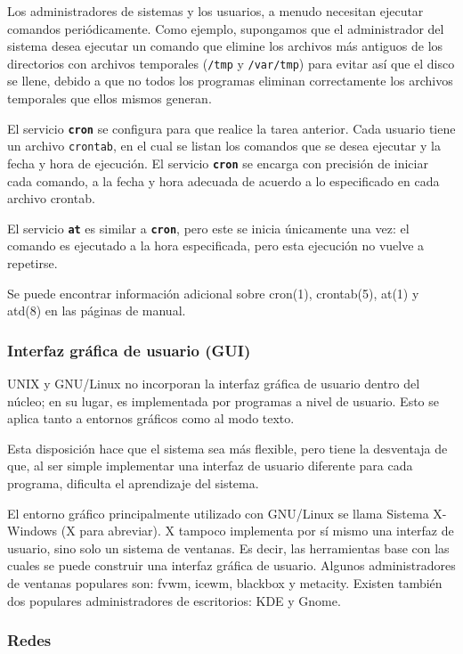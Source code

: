 \documentclass[12pt]{article}
\begin{document}
 Los administradores de sistemas y los usuarios, a menudo necesitan
ejecutar comandos periódicamente. Como ejemplo, supongamos que el administrador
del sistema desea ejecutar un comando que elimine los archivos más antiguos de
los directorios con archivos temporales (\texttt{/tmp} y
\texttt{/var/tmp}) para evitar así que el disco se llene, debido a
que no todos los programas eliminan correctamente los archivos temporales que
ellos mismos generan.  

 El servicio \texttt{\textbf{cron}} se configura para que realice la
tarea anterior. Cada usuario tiene un archivo \texttt{crontab}, en
el cual se listan los comandos que se desea ejecutar y la fecha y hora de
ejecución. El servicio \texttt{\textbf{cron}} se encarga con precisión de
iniciar cada comando, a la fecha y hora adecuada de acuerdo a lo especificado en
cada archivo crontab.  

 El servicio \texttt{\textbf{at}} es similar a \texttt{\textbf{cron}},
pero este se inicia únicamente una vez: el comando es ejecutado a la hora
especificada, pero esta ejecución no vuelve a repetirse.  

 Se puede encontrar información adicional sobre cron(1), crontab(5), at(1)
y atd(8) en las páginas de manual.  

\subsubsection{ Interfaz gráfica de usuario (GUI)}

 UNIX y GNU/Linux no incorporan la interfaz gráfica de usuario dentro del
núcleo; en su lugar, es implementada por programas a nivel de usuario. Esto se
aplica tanto a entornos gráficos como al modo texto.  

 Esta disposición hace que el sistema sea más flexible, pero tiene la
desventaja de que, al ser simple implementar una interfaz de usuario diferente
para cada programa, dificulta el aprendizaje del sistema.  

 El entorno gráfico principalmente utilizado con GNU/Linux se llama
Sistema X-Windows (X para abreviar). X tampoco implementa por sí mismo una
interfaz de usuario, sino solo un sistema de ventanas. Es decir, las
herramientas base con las cuales se puede construir una interfaz gráfica de
usuario. Algunos administradores de ventanas populares son: fvwm, icewm,
blackbox y metacity. Existen también dos populares administradores de
escritorios: KDE y Gnome.  


\subsubsection{ Redes}
\end{document}
